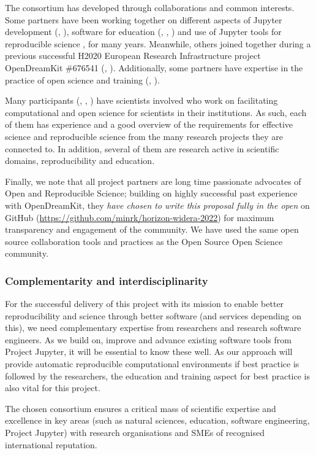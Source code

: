 The consortium has developed through collaborations and common interests. Some
partners have been working together on different aspects of Jupyter development
(, ), software for education (, ,
) and use of Jupyter tools for reproducible science {,
  } for many years. Meanwhile, others joined together during a
previous successful H2020 European Research Infrastructure project OpenDreamKit
\#676541 (, ). Additionally, some partners have expertise in
the practice of open science and training (, ).

Many participants (, , ) have scientists involved who work on
facilitating computational and open science for scientists in their
institutions. As such, each of them has experience and a good overview of the
requirements for effective science and reproducible science from the many
research projects they are connected to. In addition, several of them are
research active in scientific domains, reproducibility and education.

Finally, we note that all project partners are long time passionate advocates of
Open and Reproducible Science; building on highly successful past experience
with OpenDreamKit, they \emph{have chosen to write this proposal fully in the
  open} on GitHub
(\href{https://github.com/minrk/horizon-widera-2022}{https://github.com/minrk/horizon-widera-2022})
for maximum transparency and engagement of the community. We have used the same
open source collaboration tools and practices as the Open Source Open Science
community.

\subsubsection{Complementarity and interdisciplinarity}

For the successful delivery of this project with its mission to enable better
reproducibility and science through better software (and services depending on
this), we need complementary expertise from researchers and research software
engineers. As we build on, improve and advance existing software tools from
Project Jupyter, it will be essential to know these well. As our approach will
provide automatic reproducible computational environments if best practice is
followed by the researchers, the education and training aspect for best practice
is also vital for this project.

The chosen consortium ensures a critical mass of scientific expertise and
excellence in key areas (such as natural sciences, education, software
engineering, Project Jupyter) with research organisations and SMEs of recognised
international reputation.

